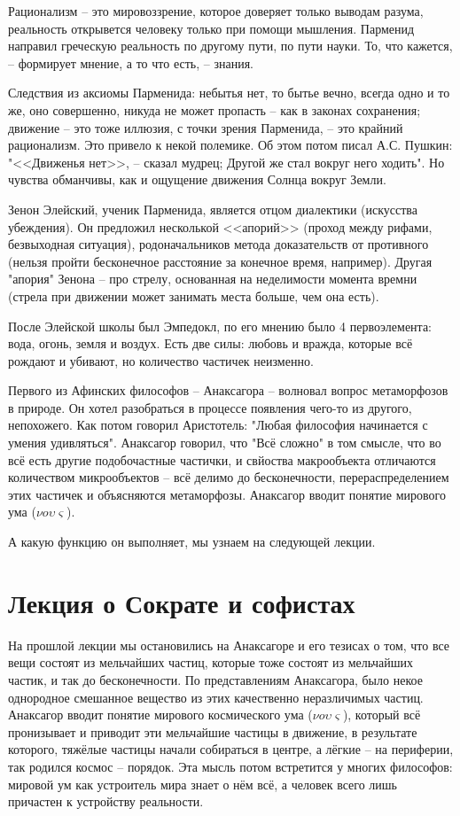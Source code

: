 \documentclass[a4paper, 12pt]{book} %
\begin{document}
Рационализм -- это мировоззрение, которое доверяет только выводам разума, реальность открывется человеку только при помощи мышления. Парменид направил греческую реальность по другому пути, по пути науки. То, что кажется, -- формирует мнение, а то что есть, -- знания.

Следствия из аксиомы Парменида: небытья нет, то бытье вечно, всегда одно и то же, оно совершенно, никуда не может пропасть -- как в законах сохранения; движение -- это тоже иллюзия, с точки зрения Парменида, -- это крайний рационализм. Это привело к некой полемике. Об этом потом писал А.С. Пушкин: "<<Движенья нет>>, -- сказал мудрец; Другой же стал вокруг него ходить". Но чувства обманчивы, как и ощущение движения Солнца вокруг Земли.

Зенон Элейский, ученик Парменида, является отцом диалектики (искусства убеждения). Он предложил несколькой <<апорий>> (проход между рифами, безвыходная ситуация), родоначальников метода доказательств от противного (нельзя пройти бесконечное расстояние за конечное время, например). Другая "апория" Зенона -- про стрелу, основанная на неделимости момента времни (стрела при движении может занимать места больше, чем она есть).

После Элейской школы был Эмпедокл, по его мнению было 4 первоэлемента: вода, огонь, земля и воздух. Есть две силы: любовь и вражда, которые всё рождают и убивают, но количество частичек неизменно.

Первого из Афинских философов -- Анаксагора -- волновал вопрос метаморфозов в природе. Он хотел разобраться в процессе появления чего-то из другого, непохожего. Как потом говорил Аристотель: "Любая философия начинается с умения удивляться". Анаксагор говорил, что "Всё сложно" в том смысле, что во всё есть другие подобочастные частички, и свйоства макрообъекта отличаются количеством микрообъектов -- всё делимо до бесконечности, перераспределением этих частичек и объясняются метаморфозы. Анаксагор вводит понятие мирового ума ($\nu o \upsilon \varsigma $).

А какую функцию он выполняет, мы узнаем на следующей лекции.

\newpage

\section{Лекция о Сократе и софистах}

На прошлой лекции мы остановились на Анаксагоре и его тезисах о том, что все вещи состоят из мельчайших частиц, которые тоже состоят из мельчайших частик, и так до бесконечности. По представлениям Анаксагора, было некое однородное смешанное вещество из этих качественно неразличимых частиц. Анаксагор вводит понятие мирового космического ума ($\nu o \upsilon \varsigma $), который всё пронизывает и приводит эти мельчайшие частицы в движение, в результате которого, тяжёлые частицы начали собираться в центре, а лёгкие  -- на периферии, так родился космос -- порядок. Эта мысль потом встретится у многих философов: мировой ум как устроитель мира знает о нём всё, а человек всего лишь причастен к устройству реальности.
\end{document}
